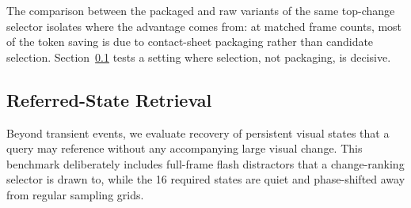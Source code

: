 \documentclass[conference]{IEEEtran}
\begin{document}
\begin{table}[t]
\centering
\small
\caption{Event retrieval on a 12-event synthetic source. Utility is the editorial fidelity proxy (Eq.~\ref{eq:fidelity}).}
\label{tab:event_retrieval}
\end{table}

The comparison between the packaged and raw variants of the same top-change selector isolates where the advantage comes from: at matched frame counts, most of the token saving is due to contact-sheet packaging rather than candidate selection. Section~\ref{sec:referred_state} tests a setting where selection, not packaging, is decisive.

\subsection{Referred-State Retrieval}
\label{sec:referred_state}
Beyond transient events, we evaluate recovery of persistent visual states that a query may reference without any accompanying large visual change. This benchmark deliberately includes full-frame flash distractors that a change-ranking selector is drawn to, while the 16 required states are quiet and phase-shifted away from regular sampling grids.

\begin{table}[t]
\centering
\small
\caption{Referred-state retrieval (16 required quiet states, 32 flash distractors).}
\label{tab:referred_state}
\end{table}
\end{document}
